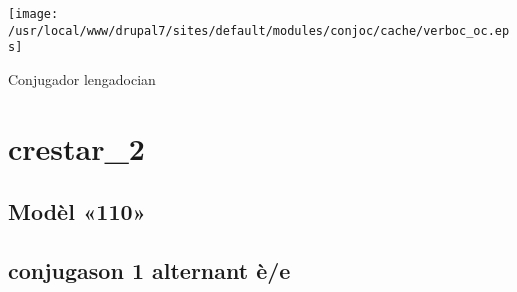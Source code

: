 \documentclass[10pt,a4paper,final]{article}
\author{Òsca-Font dubèrta}
\begin{document}
\begin{center}
\texttt{[image: /usr/local/www/drupal7/sites/default/modules/conjoc/cache/verboc\_oc.eps]}
\end{center}

\begin{center}
\huge{Conjugador lengadocian}
\end{center}

\section*{crestar_2}
\subsection*{Modèl «110»}
\subsection*{conjugason 1 alternant è/e}
\end{document}
